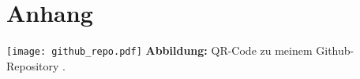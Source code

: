 \chapter*{Anhang}

\begin{center}
    \texttt{[image: github\_repo.pdf]}
    \vspace{0.5cm}
    \textbf{Abbildung:} QR-Code zu meinem Github-Repository \cite{git:repo}.
\end{center}